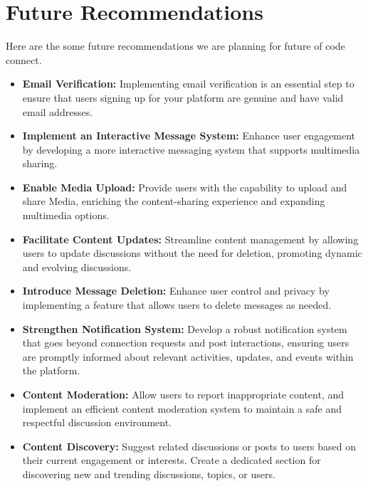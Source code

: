 \section{Future Recommendations}
Here are the some future recommendations we are planning for future of code connect.
\begin{itemize}
    \item \textbf{Email Verification:} 
    Implementing email verification is an essential step to ensure that users signing up for your platform are genuine and have valid email addresses. 
    \item \textbf{Implement an Interactive Message System:} Enhance user engagement by developing a more interactive messaging system that supports multimedia sharing.
    \item \textbf{Enable Media Upload:} Provide users with the capability to upload and share Media, enriching the content-sharing experience and expanding multimedia options.
    \item \textbf{Facilitate Content Updates:} Streamline content management by allowing users to update discussions without the need for deletion, promoting dynamic and evolving discussions.
    \item \textbf{Introduce Message Deletion:}  Enhance user control and privacy by implementing a feature that allows users to delete messages as needed.
    \item \textbf{Strengthen Notification System:} Develop a robust notification system that goes beyond connection requests and post interactions, ensuring users are promptly informed about relevant activities, updates, and events within the platform.
    \item \textbf{Content Moderation:}
     Allow users to report inappropriate content, and implement an efficient content moderation system to maintain a safe and respectful discussion environment.
    

    \item \textbf{Content Discovery:} Suggest related discussions or posts to users based on their current engagement or interests.
    Create a dedicated section for discovering new and trending discussions, topics, or users.
\end{itemize}


